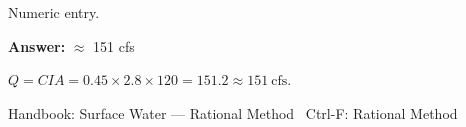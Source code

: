 \documentclass[11pt]{article}
\begin{document}
{\small\color{soft}Numeric entry.}\par\vspace{3pt}
\vspace{2pt}\par\noindent\colorbox{boxbg}{\parbox{\dimexpr\linewidth-2\fboxsep\relax}{%
\vspace{2pt}\textbf{Answer:} $\approx$ 151 cfs\par\vspace{2pt}
{\small $Q = CIA = 0.45 \times 2.8 \times 120 = 151.2 \approx 151\ \mathrm{cfs}$.}\par\vspace{2pt}
{\footnotesize\color{soft}Handbook: Surface Water --- Rational Method \textbullet\ Ctrl-F: Rational Method}\vspace{2pt}
}}
\vspace{9pt}
\end{document}
